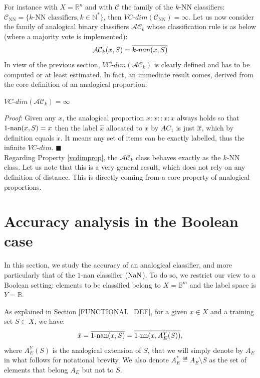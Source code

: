 For instance with $X=\mathbb{R}^n$ and with $\mathcal{C}$ the family of the $k$-NN
classifiers: $\mathcal{C}_{\text{NN}}=\{ k\text{-NN classifiers}, k \in \mathbb{N}^*\}$,
then $VC\mbox{-}dim(\mathcal{C}_{\text{NN}})=\infty$.
Let us now consider the family of analogical binary classifiers $\mathcal{AC}_k$ whose classification rule is as below (where a majority vote is implemented):
$$\mathcal{AC}_k(x,S) = \overline{k\mbox{-}nan(x,S)}$$
In view of the previous section, $VC\mbox{-}dim(\mathcal{AC}_k)$ is clearly defined and has to be computed
or at least estimated.
In fact, an immediate result comes, derived from the core definition of an analogical proportion:
\begin{property}\label{vcdimprop}
$VC\mbox{-}dim(\mathcal{AC}_k) = \infty$
\end{property}
{\it Proof}: Given any $x$, the analogical proportion $x:x::x:x$ always
holds so that $1\mbox{-nan}(x,S)=x$ then the label $\hat{x}$ allocated to $x$ by $AC_1$
is just $\overline{x}$, which by definition equals $\dot{x}$. It means any set of items can be
exactly labelled, thus the infinite $VC\mbox{-}dim$.  \hfill $\blacksquare$\\
Regarding Property \ref{vcdimprop}, the $\mathcal{AC}_k$ class
behaves exactly as the $k\mbox{-NN}$ class.
Let us note that this is a very general result, which does not rely on any definition of distance.
This is directly coming from a core property of analogical proportions.

\section{Accuracy analysis in the Boolean case}\label{accuracy}

In this section, we study the accuracy of an analogical classifier, and more
particularly that of the $1$-nan classifier ($\mbox{NaN}$). To do so, we restrict
our view to a Boolean setting: elements to be classified belong to
$X=\mathbb{B}^m$ and the label space is $Y = \mathbb{B}$.

As explained in Section \ref{FUNCTIONAL_DEF}, for a given $x \in X$ and a training set
$S \subset X$, we have:
\begin{equation}\label{eq1}
\hat{x}=\overline{1\mbox{-nan}(x, S)}=\overline{1\mbox{-nn}(x, A_E^Y(S))},
\end{equation}
where $A_E^Y(S)$ is the analogical extension of $S$, that we will simply denote
by $A_E$ in what follows for notational brevity.  We also denote $A_E^*
\eqdef A_E \setminus S$ as the set of elements that belong $A_E$ but not to
$S$.

